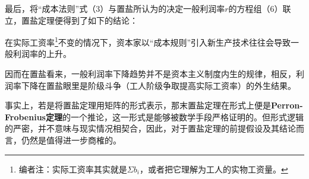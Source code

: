 \documentclass[a4paper,twoside,12pt,AutoFakeBold]{ctexart}
\begin{document}
\vspace{0.5cm} %

最后，将“成本法则”式（3）与置盐所认为的决定一般利润率$r$的方程组（6）联立，置盐定理便得到了如下的结论：
\begin{tcolorbox}
    在实际工资率\footnote{编者注：实际工资率其实就是$\Sigma b_i$，或者把它理解为工人的实物工资量。}不变的情况下，资本家以“成本规则”引入新生产技术往往会导致一般利润率的上升。
\end{tcolorbox}
因而在置盐看来，一般利润率下降趋势并不是资本主义制度内生的规律，相反，利润率下降在置盐眼里是阶级斗争（工人阶级争取提高实际工资率）的外生结果。

事实上，若是将置盐定理用矩阵的形式表示，那末置盐定理在形式上便是\textbf{Perron-Frobenius定理}的一个推论，这一形式是能够被数学手段严格证明的。但形式逻辑的严密，并不意味与现实情况相契合，因此，对于置盐定理的前提假设及其结论而言，仍然是值得进一步商榷的。
\end{document}
